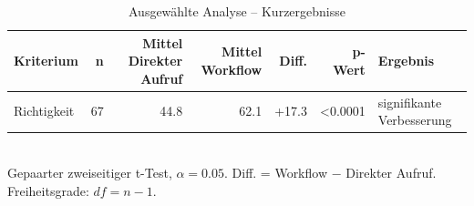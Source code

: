 \begin{table}[htbp]
\centering
\caption{Ausgewählte Analyse -- Kurzergebnisse}
\begin{tabular}{lrrrrrl}
\toprule
Kriterium & n & Mittel Direkter Aufruf & Mittel Workflow & Diff. & p-Wert & Ergebnis \\
\midrule
Richtigkeit & 67 & 44.8 & 62.1 & +17.3 & <0.0001 & signifikante Verbesserung \\
\bottomrule
\end{tabular}
\\[2mm]
\footnotesize Gepaarter zweiseitiger t-Test, $\alpha=0.05$. Diff. = Workflow $-$ Direkter Aufruf. Freiheitsgrade: $df=n-1$.
\end{table}
